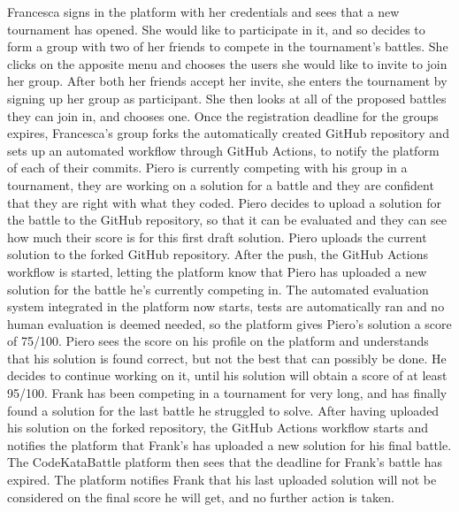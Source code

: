 \documentclass{article}
\newcounter{subsubsubsection}[subsubsection]
\begin{document}
{            
                Francesca signs in the platform with her credentials and sees that a new tournament has opened. She would like to participate in it, and so decides to form a group with two of her friends to compete in the tournament's battles. She clicks on the apposite menu and chooses the users she would like to invite to join her group.
                After both her friends accept her invite, she enters the tournament by signing up her group as participant. She then looks at all of the proposed battles they can join in, and chooses one.
                Once the registration deadline for the groups expires, Francesca's group forks the automatically created GitHub repository and sets up an automated workflow through GitHub Actions, to notify the platform of each of their commits.
                Piero is currently competing with his group in a tournament, they are working on a solution for a battle and they are confident that they are right with what they coded. Piero decides to upload a solution for the battle to the GitHub repository, so that it can be evaluated and they can see how much their score is for this first draft solution.
                Piero uploads the current solution to the forked GitHub repository. After the push, the GitHub Actions workflow is started, letting the platform know that Piero has uploaded a new solution for the battle he's currently competing in.
                The automated evaluation system integrated in the platform now starts, tests are automatically ran and no human evaluation is deemed needed, so the platform gives Piero's solution a score of 75/100.
                Piero sees the score on his profile on the platform and understands that his solution is found correct, but not the best that can possibly be done. He decides to continue working on it, until his solution will obtain a score of at least 95/100.
                Frank has been competing in a tournament for very long, and has finally found a solution for the last battle he struggled to solve. After having uploaded his solution on the forked repository, the GitHub Actions workflow starts and notifies the platform that Frank's has uploaded a new solution for his final battle.
                The CodeKataBattle platform then sees that the deadline for Frank's battle has expired. The platform notifies Frank that his last uploaded solution will not be considered on the final score he will get, and no further action is taken.
}
\end{document}
